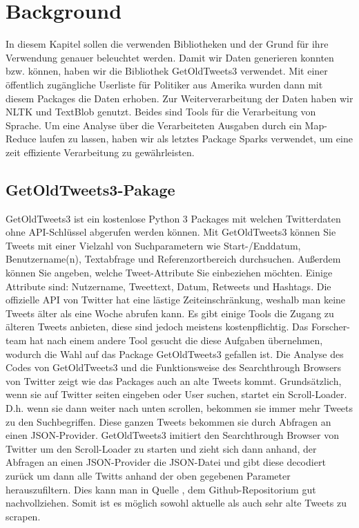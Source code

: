 \section{Background}


	In diesem Kapitel sollen die verwenden Bibliotheken und der Grund für ihre Verwendung genauer beleuchtet werden. Damit wir Daten generieren konnten bzw. 
	können, haben wir die Bibliothek GetOldTweets3 verwendet. Mit einer öffentlich zugängliche Userliste für Politiker aus Amerika wurden dann mit diesem 
	Packages die Daten erhoben. Zur Weiterverarbeitung der Daten haben wir NLTK und TextBlob genutzt. Beides sind Tools für die Verarbeitung von Sprache. Um 
	eine Analyse über  die Verarbeiteten Ausgaben durch ein Map-Reduce laufen zu lassen, haben wir als letztes Package Sparks verwendet, um eine zeit 
	effiziente Verarbeitung zu gewährleisten.  
	
	 
	\subsection{GetOldTweets3-Pakage}
	
	GetOldTweets3 ist ein kostenlose Python 3 Packages mit welchen Twitterdaten ohne API-Schlüssel abgerufen werden können.
	Mit GetOldTweets3 können Sie Tweets mit einer Vielzahl von Suchparametern wie Start-/Enddatum, Benutzername(n), Textabfrage 
	und Referenzortbereich durchsuchen. Außerdem können Sie angeben, welche Tweet-Attribute Sie einbeziehen möchten. Einige Attribute
	sind: Nutzername, Tweettext, Datum, Retweets und Hashtags.  
	Die offizielle API von Twitter hat eine lästige Zeiteinschränkung, weshalb man keine Tweets älter als eine Woche abrufen 
	kann. Es gibt einige Tools die Zugang zu älteren Tweets anbieten, diese sind jedoch meistens kostenpflichtig. Das Forscher-
	team hat nach einem andere Tool gesucht die diese Aufgaben übernehmen, wodurch die Wahl auf das Package GetOldTweets3 gefallen 
	ist.    	
	Die Analyse des Codes von GetOldTweets3 und die Funktionsweise des Searchthrough Browsers von Twitter zeigt wie das Packages auch
	an alte Tweets kommt. Grundsätzlich, wenn sie auf Twitter seiten eingeben oder User suchen, startet ein Scroll-Loader. D.h. wenn sie
	dann weiter nach unten scrollen, bekommen sie immer mehr Tweets zu den Suchbegriffen. Diese ganzen Tweets bekommen sie durch Abfragen 
	an einen JSON-Provider. GetOldTweets3 imitiert den Searchthrough Browser von Twitter um den Scroll-Loader zu starten und zieht sich dann 
	anhand, der Abfragen an einen JSON-Provider die JSON-Datei und gibt diese decodiert zurück um dann alle Twitts anhand der oben gegebenen 
	Parameter herauszufiltern. Dies kann man in Quelle , dem Github-Repositorium gut nachvollziehen. Somit ist es möglich sowohl 
	aktuelle als auch sehr alte Tweets zu scrapen. 
	
